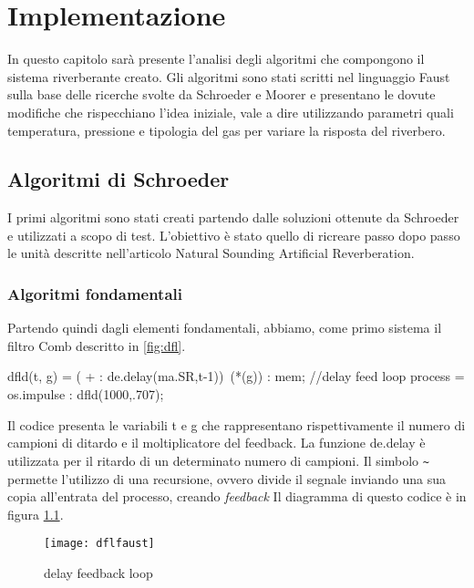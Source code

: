 
\chapter{Implementazione}
\label{chp:Implementazione}

In questo capitolo sarà presente l’analisi degli algoritmi che compongono il sistema riverberante creato. Gli algoritmi sono stati scritti nel linguaggio Faust sulla base delle ricerche svolte da Schroeder e Moorer e presentano le dovute modifiche che rispecchiano l’idea iniziale, vale a dire utilizzando parametri quali temperatura, pressione e tipologia del gas per variare la risposta del riverbero.

\section{Algoritmi di Schroeder}

I primi algoritmi sono stati creati partendo dalle soluzioni ottenute da Schroeder e utilizzati a scopo di test. L’obiettivo è stato quello di ricreare passo dopo passo le unità descritte nell’articolo Natural Sounding Artificial Reverberation. 

\subsection{Algoritmi fondamentali}

Partendo quindi dagli elementi fondamentali, abbiamo, come primo sistema il filtro Comb descritto in \ref{fig:dfl}.
\begin{code}
dfld(t, g) = ( + : de.delay(ma.SR,t-1))~(*(g)) : mem; //delay feed loop 
process = os.impulse : dfld(1000,.707);
\end{code}

Il codice presenta le variabili t e g che rappresentano rispettivamente il numero di campioni di ditardo e il moltiplicatore del feedback.
La funzione de.delay è utilizzata per il ritardo di un determinato numero di campioni.
Il simbolo \verb!~! permette l'utilizzo di una recursione, ovvero divide il segnale inviando una sua copia all'entrata del processo, creando \emph{feedback}
Il diagramma di questo codice è in figura \ref{fig:dflfaust}.

\bigskip

\begin{figure}[htp]
\centering
\texttt{[image: dflfaust]}
\caption{delay feedback loop}
\label{fig:dflfaust}
\end{figure}

